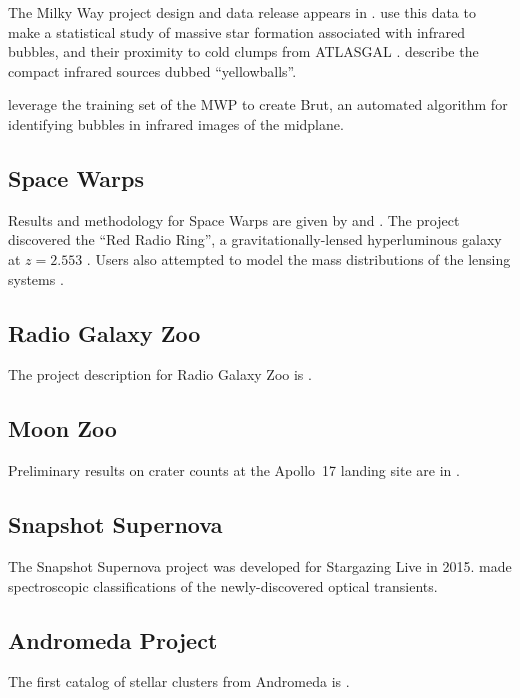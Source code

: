 \documentclass[twocolumn]{aastex6}
\begin{document}
The Milky Way project design and data release appears in \citet{sim12a}. \citet{ken12} use this data to make a statistical study of massive star formation associated with infrared bubbles, and their proximity to cold clumps from ATLASGAL \citep{ken16}. \citet{ker15} describe the compact infrared sources dubbed ``yellowballs''.

\citet{bea14} leverage the training set of the MWP to create Brut, an automated algorithm for identifying bubbles in infrared images of the midplane.

\subsection{Space Warps}

Results and methodology for Space Warps are given by \citet{mar16} and \citet{mor16}. The project discovered the ``Red Radio Ring'', a gravitationally-lensed hyperluminous galaxy at $z=2.553$ \citep{gea15}. Users also attempted to model the mass distributions of the lensing systems \citep{kun15}.

\subsection{Radio Galaxy Zoo}

The project description for Radio Galaxy Zoo is \citet{ban15}. 

\subsection{Moon Zoo}

Preliminary results on crater counts at the Apollo~17 landing site are in \citet{bug16}.

\subsection{Snapshot Supernova}

The Snapshot Supernova project was developed for Stargazing Live in 2015. \citet{cam15,car15} made spectroscopic classifications of the newly-discovered optical transients.

\subsection{Andromeda Project}

The first catalog of stellar clusters from Andromeda is \citet{joh15}.
\end{document}
